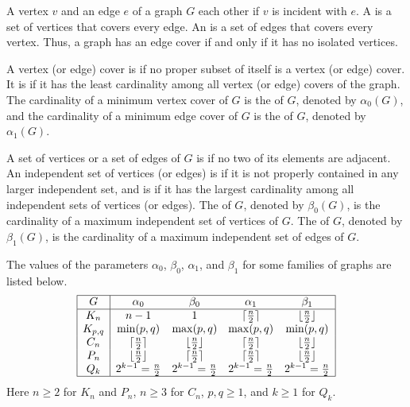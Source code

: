 A vertex $v$ and an edge $e$ of a graph $G$  each other if $v$ is incident with $e$. A  is a set of vertices that covers every edge. An  is a set of edges that covers every vertex. Thus, a graph has an edge cover if and only if it has no isolated vertices.

A vertex (or edge) cover is  if no proper subset of itself is a vertex (or edge) cover. It is  if it has the least cardinality among all vertex (or edge) covers of the graph. The cardinality of a minimum vertex cover of $G$ is the  of $G$, denoted by $\alpha_0(G)$, and the cardinality of a minimum edge cover of $G$ is the  of $G$, denoted by $\alpha_1(G)$.

A set of vertices or a set of edges of $G$ is  if no two of its elements are adjacent. An independent set of vertices (or edges) is  if it is not properly contained in any larger independent set, and is  if it has the largest cardinality among all independent sets of vertices (or edges). The  of $G$, denoted by $\beta_0(G)$, is the cardinality of a maximum independent set of vertices of $G$. The  of $G$, denoted by $\beta_1(G)$, is the cardinality of a maximum independent set of edges of $G$.

\begin{Example}\label{ex:CoveringIndependence}
The values of the parameters $\alpha_0$, $\beta_0$, $\alpha_1$, and $\beta_1$ for some families of graphs are listed below.
\def\arraystretch{1.4}
\begin{equation*}
\begin{array}{|c|cccc|}
\hline
G		&	\alpha_0			&	\beta_0				&	\alpha_1			&	\beta_1 \\
\hline
K_n		&	n - 1				&	1					&	\lceil\frac n 2\rceil	&	\lfloor\frac n 2\rfloor \\
K_{p,q}	&	\min(p, q)			&	\max(p, q)			&	\max(p, q)			&	\min(p, q) \\
C_n		&	\lceil\frac n 2\rceil	&	\lfloor\frac n 2\rfloor	&	\lceil\frac n 2\rceil	&	\lfloor\frac n 2\rfloor \\
P_n		&	\lfloor\frac n 2\rfloor	&	\lceil\frac n 2\rceil	&	\lceil\frac n 2\rceil	&	\lfloor\frac n 2\rfloor \\
Q_k		&	2^{k-1} = \frac n 2	&	2^{k-1} = \frac n 2	&	2^{k-1} = \frac n 2	&	2^{k-1} = \frac n 2 \\
\hline
\end{array}
\end{equation*}
Here $n \ge 2$ for $K_n$ and $P_n$, $n \ge 3$ for $C_n$, $p,q \ge 1$, and $k \ge 1$ for $Q_k$.
\end{Example}

